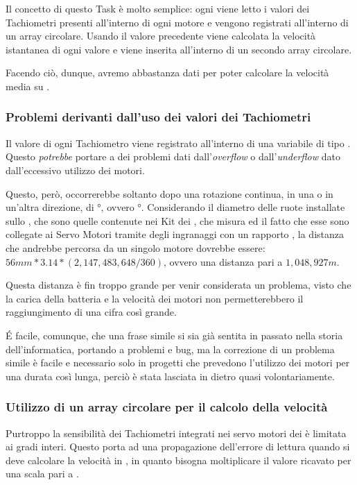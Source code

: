 Il concetto di questo Task è molto semplice: ogni  viene letto i valori
dei Tachiometri presenti all'interno di ogni motore e vengono registrati
all'interno di un array circolare. Usando il valore precedente viene
calcolata la velocità istantanea di ogni valore e viene inserita
all'interno di un secondo array circolare.

Facendo ciò, dunque, avremo abbastanza dati per poter calcolare la velocità
media su .

\subsubsection{Problemi derivanti dall'uso dei valori dei Tachiometri}
Il valore di ogni Tachiometro viene registrato all'interno di una variabile
di tipo . Questo \emph{potrebbe} portare a dei problemi
dati dall'\emph{overflow} o dall'\emph{underflow} dato dall'eccessivo
utilizzo dei motori.

Questo, però, occorrerebbe soltanto dopo una rotazione continua, in una o
in un'altra direzione, di °, ovvero
°. Considerando il diametro delle ruote installate
sullo \SPAM{}, che sono quelle contenute nei Kit  dei
\nxt{}, che misura \cypher{56mm} ed il fatto che esse sono collegate ai
Servo Motori tramite degli ingranaggi con un rapporto , la
distanza che andrebbe percorsa da un singolo motore dovrebbe essere: $56mm
* 3.14 * (2,147,483,648 / 360)$, ovvero una distanza pari a $1,048,927m$.

Questa distanza è fin troppo grande per venir considerata un problema,
visto che la carica della batteria e la velocità dei motori non
permetterebbero il raggiungimento di una cifra così grande.

\'E facile, comunque, che una frase simile si sia già sentita in passato nella
storia dell'informatica, portando a problemi e bug, ma la correzione di un
problema simile è facile e necessario solo in progetti che prevedono
l'utilizzo dei motori per una durata così lunga, perciò è stata lasciata in
dietro quasi volontariamente.

\subsubsection{Utilizzo di un array circolare per il calcolo della velocità}
Purtroppo la sensibilità dei Tachiometri integrati nei servo motori dei
\nxt{} è limitata ai gradi interi. Questo porta ad una propagazione
dell'errore di lettura quando si deve calcolare la velocità in
, in quanto bisogna moltiplicare il valore
ricavato per una scala pari a .

